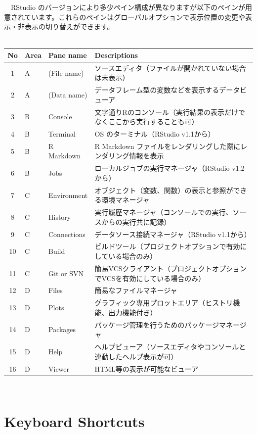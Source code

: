 \documentclass[
  12pt,
]{book}
\begin{document}
　RStudio のバージョンにより多少ペイン構成が異なりますが以下のペインが用意されています。これらのペインはグローバルオプションで表示位置の変更や表示・非表示の切り替えができます。\\
　

\begin{longtable}[]{@{}clll@{}}
\toprule
No & Area & Pane name & Descriptions \\
\midrule
\endhead
1 & A & (File name) & ソースエディタ（ファイルが開かれていない場合は未表示） \\
2 & A & (Data name) & データフレーム型の変数などを表示するデータビューア \\
3 & B & Console & 文字通りRのコンソール（実行結果の表示だけでなくここから実行することも可） \\
4 & B 　 & Terminal & OS のターミナル（RStudio v1.1から） \\
5 & B & R Markdown & R Markdown ファイルをレンダリングした際にレンダリング情報を表示 \\
6 & B 　 & Jobs & ローカルジョブの実行マネージャ（RStudio v1.2から） \\
7 & C & Environment & オブジェクト（変数、関数）の表示と参照ができる環境マネージャ \\
8 & C & History & 実行履歴マネージャ（コンソールでの実行、ソースからの実行共に記録） \\
9　 & C & Connections & データソース接続マネージャ（RStudio v1.1から） \\
10 & C & Build & ビルドツール（プロジェクトオプションで有効にしている場合のみ） \\
11 & C & Git or SVN & 簡易VCSクライアント（プロジェクトオプションでVCSを有効にしている場合のみ） \\
12 & D & Files & 簡易なファイルマネージャ \\
13 & D & Plots & グラフィック専用プロットエリア（ヒストリ機能、出力機能付き） \\
14 & D & Packages & パッケージ管理を行うためのパッケージマネージャ \\
15 & D & Help & ヘルプビューア（ソースエディタやコンソールと連動したヘルプ表示が可） \\
16 & D & Viewer & HTML等の表示が可能なビューア \\
\bottomrule
\end{longtable}

　

\hypertarget{keyboard-shortcuts}{%
\section{Keyboard Shortcuts}\label{keyboard-shortcuts}}
\end{document}

